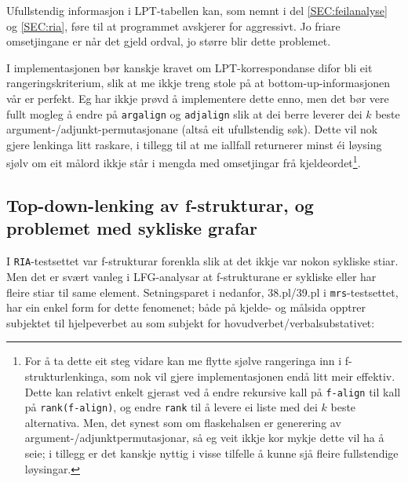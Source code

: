 \documentclass[12pt,a4paper,oneside,draft]{report}
\begin{document}
Ufullstendig informasjon i LPT-tabellen kan, som nemnt i del
 \ref{SEC:feilanalyse} og \ref{SEC:ria}, føre til at programmet
 avskjerer for aggressivt. Jo friare omsetjingane er når det gjeld
 ordval, jo større blir dette problemet.

I implementasjonen bør kanskje kravet om LPT\hyp{}korrespondanse difor bli
 eit rangeringskriterium, slik at me ikkje treng stole på at
 bottom-up-informasjonen vår er perfekt. Eg har ikkje prøvd å
 implementere dette enno, men det bør vere fullt mogleg å endre på
 \texttt{argalign} og \texttt{adjalign} slik at dei berre leverer dei $k$ beste
 argument-/adjunkt-permutasjonane (altså eit ufullstendig søk). Dette
 vil nok gjere lenkinga litt raskare, i tillegg til at me iallfall
 returnerer minst éi løysing sjølv om eit målord ikkje står i mengda
 med omsetjingar frå kjeldeordet\footnote{For å ta dette eit steg vidare kan me flytte sjølve rangeringa
        inn i f\hyp{}strukturlenkinga, som nok vil gjere implementasjonen
        endå litt meir effektiv. Dette kan relativt enkelt gjerast ved
        å endre rekursive kall på \texttt{f-align} til kall på
        \texttt{rank(f-align)}, og endre \texttt{rank} til å levere ei liste med dei
        $k$ beste alternativa. Men, det synest som om flaskehalsen er
        generering av argument-/adjunktpermutasjonar, så eg veit
        ikkje kor mykje dette vil ha å seie; i tillegg er det kanskje
        nyttig i visse tilfelle å kunne sjå fleire fullstendige
        løysingar. }.




\subsection{Top-down-lenking av f\hyp{}strukturar, og problemet med sykliske grafar}
\label{sec-5.4.2}

    \label{SEC:reentrancy}

I \texttt{RIA}-testsettet var f\hyp{}strukturar forenkla slik at det ikkje var
nokon sykliske stiar. Men det er svært vanleg i LFG-analysar at
f\hyp{}strukturane er sykliske eller har fleire stiar til same
element. Setningsparet i \Next nedanfor, 38.pl/39.pl i \texttt{mrs}-testsettet, har
ein enkel form for dette fenomenet; både på kjelde- og målsida opptrer
subjektet til hjelpeverbet au som subjekt for
hovudverbet/verbalsubstativet:
\end{document}
